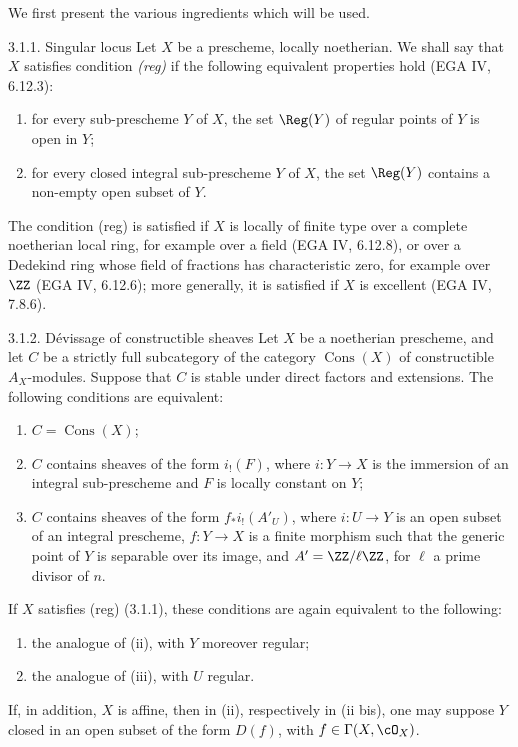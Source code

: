 We first present the various ingredients which will be used.

\begin{statement}{3.1.1. Singular locus}
Let $X$ be a prescheme, locally noetherian. We shall say that $X$ satisfies condition \emph{(reg)} if the following equivalent properties hold (EGA IV, 6.12.3):
\begin{enumerate}[label=(\roman*)]
\item for every sub-prescheme $Y$ of $X$, the set $\Reg(Y)$ of regular points of $Y$ is open in $Y$;
\item for every closed integral sub-prescheme $Y$ of $X$, the set $\Reg(Y)$ contains a non-empty open subset of $Y$.
\end{enumerate}
The condition (reg) is satisfied if $X$ is locally of finite type over a complete noetherian local ring, for example over a field (EGA IV, 6.12.8), or over a Dedekind ring whose field of fractions has characteristic zero, for example over $\ZZ$ (EGA IV, 6.12.6); more generally, it is satisfied if $X$ is excellent (EGA IV, 7.8.6).
\end{statement}

\begin{statement}{3.1.2. Dévissage of constructible sheaves}
Let $X$ be a noetherian prescheme, and let $C$ be a strictly full subcategory of the category $\operatorname{Cons}(X)$ of constructible $A_X$-modules. Suppose that $C$ is stable under direct factors and extensions. The following conditions are equivalent:
\begin{enumerate}[label=(\roman*)]
\item $C=\operatorname{Cons}(X)$;
\item $C$ contains sheaves of the form $i_!(F)$, where $i:Y\to X$ is the immersion of an integral sub-prescheme and $F$ is locally constant on $Y$;
\item $C$ contains sheaves of the form $f_*i_!(A'_U)$, where $i:U\to Y$ is an open subset of an integral prescheme, $f:Y\to X$ is a finite morphism such that the generic point of $Y$ is separable over its image, and $A'=\ZZ/\ell\ZZ$, for $\ell$ a prime divisor of $n$.
\end{enumerate}
If $X$ satisfies (reg) (3.1.1), these conditions are again equivalent to the following:
\begin{enumerate}[label=(\roman* bis),start=2]
\item the analogue of (ii), with $Y$ moreover regular;
\item the analogue of (iii), with $U$ regular.
\end{enumerate}
If, in addition, $X$ is affine, then in (ii), respectively in (ii bis), one may suppose $Y$ closed in an open subset of the form $D(f)$, with $f\in \Gamma(X,\cO_X)$.
\end{statement}

